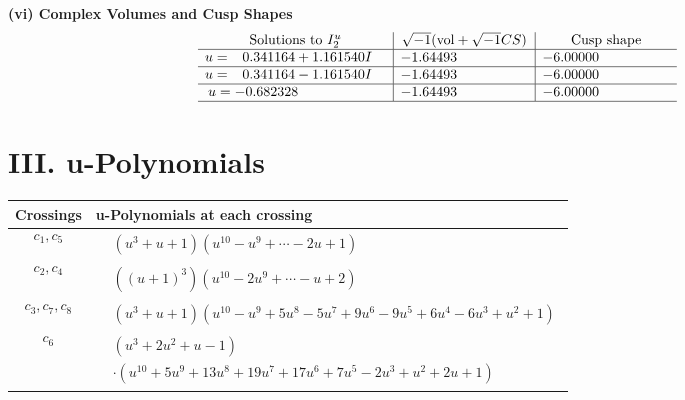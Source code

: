 \documentclass[1p]{elsarticle_modified}
\theoremstyle{definition}
\newcommand{\I}{\sqrt{-1}}
\begin{document}
\newpage\flushleft \textbf{(vi) Complex Volumes and Cusp Shapes}
$$\begin{array}{c|c|c}  
\text{Solutions to }I^u_{2}& \I (\text{vol} + \sqrt{-1}CS) & \text{Cusp shape}\\
 \hline 
\begin{aligned}
u &= \phantom{-}0.341164 + 1.161540 I\end{aligned}
 & -1.64493\phantom{ +0.000000I} & -6.00000\phantom{ +0.000000I} \\ \hline\begin{aligned}
u &= \phantom{-}0.341164 - 1.161540 I\end{aligned}
 & -1.64493\phantom{ +0.000000I} & -6.00000\phantom{ +0.000000I} \\ \hline\begin{aligned}
u &= -0.682328\phantom{ +0.000000I}\end{aligned}
 & -1.64493\phantom{ +0.000000I} & -6.00000\phantom{ +0.000000I}\\
 \hline 
 \end{array}$$\newpage
\newpage\renewcommand{\arraystretch}{1}
\centering \section*{ III. u-Polynomials}
\begin{tabular}{m{50pt}|m{274pt}}
Crossings & \hspace{64pt}u-Polynomials at each crossing \\
\hline $$\begin{aligned}c_{1},c_{5}\end{aligned}$$&$\begin{aligned}
&(u^3+u+1)(u^{10}- u^9+\cdots-2 u+1)
\end{aligned}$\\
\hline $$\begin{aligned}c_{2},c_{4}\end{aligned}$$&$\begin{aligned}
&((u+1)^3)(u^{10}-2 u^9+\cdots- u+2)
\end{aligned}$\\
\hline $$\begin{aligned}c_{3},c_{7},c_{8}\end{aligned}$$&$\begin{aligned}
&(u^3+u+1)(u^{10}- u^9+5 u^8-5 u^7+9 u^6-9 u^5+6 u^4-6 u^3+u^2+1)
\end{aligned}$\\
\hline $$\begin{aligned}c_{6}\end{aligned}$$&$\begin{aligned}
&(u^3+2 u^2+u-1)\\
&\cdot(u^{10}+5 u^9+13 u^8+19 u^7+17 u^6+7 u^5-2 u^3+u^2+2 u+1)
\end{aligned}$\\
\hline
\end{tabular}\newpage\renewcommand{\arraystretch}{1}
\end{document}

